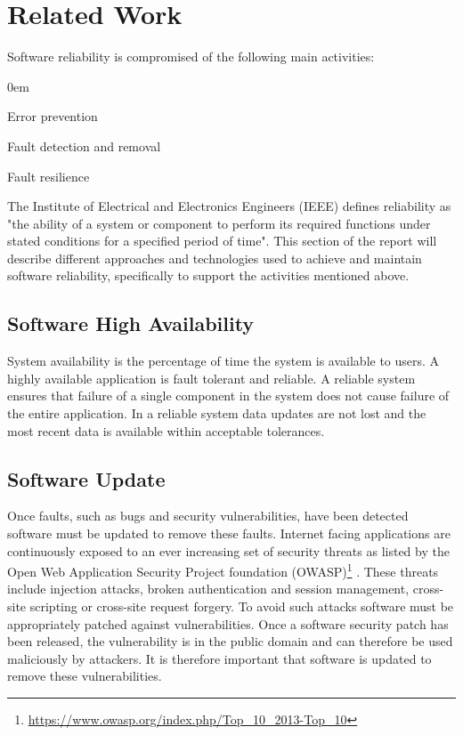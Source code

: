 \documentclass[a4paper,11pt,twoside]{report}
\begin{document}
\chapter{Related Work}
Software reliability is compromised of the following main activities:

  \begin{list}{-}{}
  \itemsep0em
  \item Error prevention 
  
  \item Fault detection and removal
  
  \item Fault resilience
  \end{list}

\noindent
The Institute of Electrical and Electronics Engineers (IEEE) defines reliability as "the ability of a system or component to perform its required functions under stated conditions for a specified period of time". 
This section of the report will describe different approaches and technologies used to achieve and maintain software reliability, specifically to support the activities mentioned above. 

\section{Software High Availability }\label{subsec:rules}
System availability is the percentage of time the system is available to users. A highly available application is fault tolerant and reliable. A reliable system ensures that failure of a single component in the system does not cause failure of the entire application. In a reliable system data updates are not lost and the most recent data is available within acceptable tolerances. 


\section{Software Update} 
Once faults, such as bugs and security vulnerabilities, have been detected software must be updated to remove these faults. Internet facing applications are continuously exposed to an ever increasing set of security threats as listed by the Open Web Application Security Project foundation (OWASP)\footnote{\url{https://www.owasp.org/index.php/Top_10_2013-Top_10}} . These threats include injection attacks, broken authentication and session management, cross-site scripting or cross-site request forgery. To avoid such attacks software must be appropriately patched against vulnerabilities. Once a software security patch has been released, the vulnerability is in the public domain and can therefore be used maliciously by attackers. It is therefore important that software is updated to remove these vulnerabilities.
\end{document}
